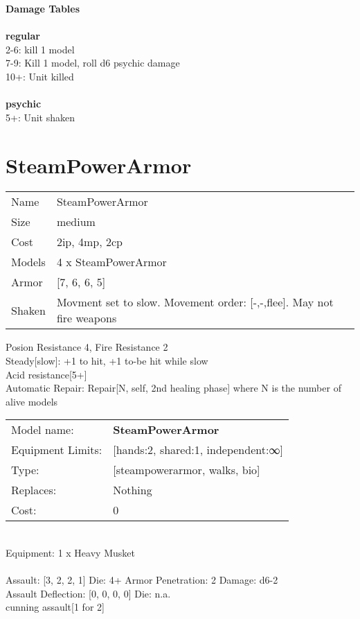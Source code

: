 {\bf Damage Tables} \\
\ \\ {\bf regular } \\
2-6: kill 1 model \\
7-9: Kill 1 model, roll d6 psychic damage \\
10+: Unit killed \\
\ \\ {\bf psychic } \\
5+: Unit shaken \\










\pagebreak\pagebreak

\section{ SteamPowerArmor }

\begin{tabular}{ll}
  Name & SteamPowerArmor \\
  Size & medium\\
  Cost & 2ip, 4mp, 2cp\\
  Models & 4 x SteamPowerArmor\\
  Armor & [7, 6, 6, 5]\\
  Shaken & Movment set to slow. Movement order: [-,-,flee]. May not fire weapons\\
\end{tabular}

\noindent Posion Resistance 4, Fire Resistance 2\\ 
Steady[slow]: +1 to hit, +1 to-be hit while slow\\ 
Acid resistance[5+]\\ 
Automatic Repair: Repair[N, self, 2nd healing phase] where N is the number of alive models\\ 


\noindent
\begin{tabular}{ll}
Model name: &{\bf SteamPowerArmor } \\
Equipment Limits: &[hands:2, shared:1, independent:∞] \\
Type: &[steampowerarmor, walks, bio] \\
Replaces: &Nothing \\
Cost: & 0\\
\end{tabular}
\ \\
Equipment: 1 x Heavy Musket \\
\ \\
Assault: [3, 2, 2, 1] Die: 4+ Armor Penetration: 2 Damage: d6-2 \\
Assault Deflection: [0, 0, 0, 0] Die: n.a.\\
\indent cunning assault[1 for 2]\\ 
 
